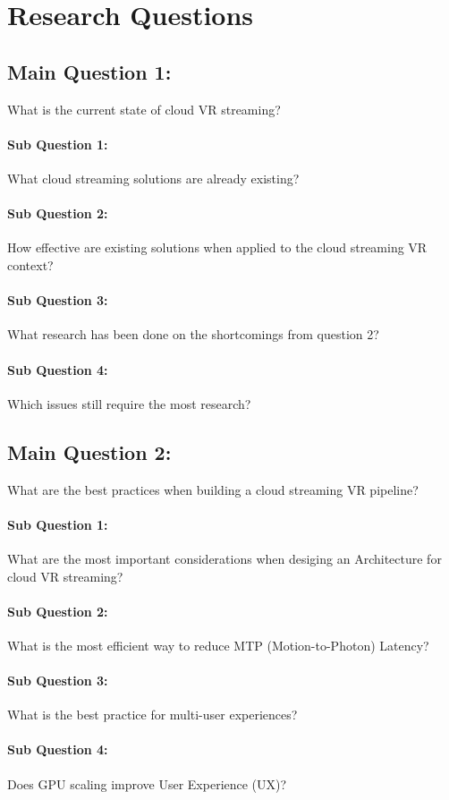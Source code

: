 \section{Research Questions}

\subsection*{Main Question 1:} What is the current state of cloud VR streaming?
\paragraph{Sub Question 1:} What cloud streaming solutions are already existing?
\paragraph{Sub Question 2:} How effective are existing solutions when applied to the cloud streaming VR context?
\paragraph{Sub Question 3:} What research has been done on the shortcomings from question 2?
\paragraph{Sub Question 4:} Which issues still require the most research?

\subsection*{Main Question 2:} What are the best practices when building a cloud streaming VR pipeline?
\paragraph{Sub Question 1:} What are the most important considerations when desiging an Architecture for cloud VR streaming?
\paragraph{Sub Question 2:} What is the most efficient way to reduce MTP (Motion-to-Photon) Latency?
\paragraph{Sub Question 3:} What is the best practice for multi-user experiences?
\paragraph{Sub Question 4:} Does GPU scaling improve User Experience (UX)?
